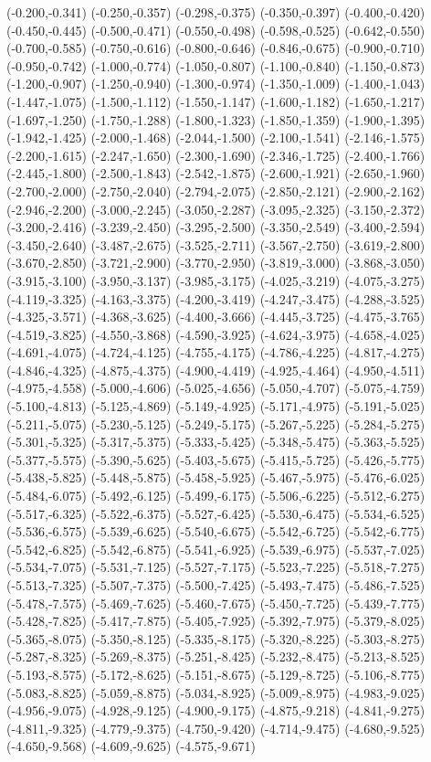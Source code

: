 (-0.200,-0.341) (-0.250,-0.357) (-0.298,-0.375) (-0.350,-0.397) (-0.400,-0.420) (-0.450,-0.445) (-0.500,-0.471) (-0.550,-0.498) (-0.598,-0.525) (-0.642,-0.550) (-0.700,-0.585) (-0.750,-0.616) (-0.800,-0.646) (-0.846,-0.675) (-0.900,-0.710) (-0.950,-0.742) (-1.000,-0.774) (-1.050,-0.807) (-1.100,-0.840) (-1.150,-0.873) (-1.200,-0.907) (-1.250,-0.940) (-1.300,-0.974) (-1.350,-1.009) (-1.400,-1.043) (-1.447,-1.075) (-1.500,-1.112) (-1.550,-1.147) (-1.600,-1.182) (-1.650,-1.217) (-1.697,-1.250) (-1.750,-1.288) (-1.800,-1.323) (-1.850,-1.359) (-1.900,-1.395) (-1.942,-1.425) (-2.000,-1.468) (-2.044,-1.500) (-2.100,-1.541) (-2.146,-1.575) (-2.200,-1.615) (-2.247,-1.650) (-2.300,-1.690) (-2.346,-1.725) (-2.400,-1.766) (-2.445,-1.800) (-2.500,-1.843) (-2.542,-1.875) (-2.600,-1.921) (-2.650,-1.960) (-2.700,-2.000) (-2.750,-2.040) (-2.794,-2.075) (-2.850,-2.121) (-2.900,-2.162) (-2.946,-2.200) (-3.000,-2.245) (-3.050,-2.287) (-3.095,-2.325) (-3.150,-2.372) (-3.200,-2.416) (-3.239,-2.450) (-3.295,-2.500) (-3.350,-2.549) (-3.400,-2.594) (-3.450,-2.640) (-3.487,-2.675) (-3.525,-2.711) (-3.567,-2.750) (-3.619,-2.800) (-3.670,-2.850) (-3.721,-2.900) (-3.770,-2.950) (-3.819,-3.000) (-3.868,-3.050) (-3.915,-3.100) (-3.950,-3.137) (-3.985,-3.175) (-4.025,-3.219) (-4.075,-3.275) (-4.119,-3.325) (-4.163,-3.375) (-4.200,-3.419) (-4.247,-3.475) (-4.288,-3.525) (-4.325,-3.571) (-4.368,-3.625) (-4.400,-3.666) (-4.445,-3.725) (-4.475,-3.765) (-4.519,-3.825) (-4.550,-3.868) (-4.590,-3.925) (-4.624,-3.975) (-4.658,-4.025) (-4.691,-4.075) (-4.724,-4.125) (-4.755,-4.175) (-4.786,-4.225) (-4.817,-4.275) (-4.846,-4.325) (-4.875,-4.375) (-4.900,-4.419) (-4.925,-4.464) (-4.950,-4.511) (-4.975,-4.558) (-5.000,-4.606) (-5.025,-4.656) (-5.050,-4.707) (-5.075,-4.759) (-5.100,-4.813) (-5.125,-4.869) (-5.149,-4.925) (-5.171,-4.975) (-5.191,-5.025) (-5.211,-5.075) (-5.230,-5.125) (-5.249,-5.175) (-5.267,-5.225) (-5.284,-5.275) (-5.301,-5.325) (-5.317,-5.375) (-5.333,-5.425) (-5.348,-5.475) (-5.363,-5.525) (-5.377,-5.575) (-5.390,-5.625) (-5.403,-5.675) (-5.415,-5.725) (-5.426,-5.775) (-5.438,-5.825) (-5.448,-5.875) (-5.458,-5.925) (-5.467,-5.975) (-5.476,-6.025) (-5.484,-6.075) (-5.492,-6.125) (-5.499,-6.175) (-5.506,-6.225) (-5.512,-6.275) (-5.517,-6.325) (-5.522,-6.375) (-5.527,-6.425) (-5.530,-6.475) (-5.534,-6.525) (-5.536,-6.575) (-5.539,-6.625) (-5.540,-6.675) (-5.542,-6.725) (-5.542,-6.775) (-5.542,-6.825) (-5.542,-6.875) (-5.541,-6.925) (-5.539,-6.975) (-5.537,-7.025) (-5.534,-7.075) (-5.531,-7.125) (-5.527,-7.175) (-5.523,-7.225) (-5.518,-7.275) (-5.513,-7.325) (-5.507,-7.375) (-5.500,-7.425) (-5.493,-7.475) (-5.486,-7.525) (-5.478,-7.575) (-5.469,-7.625) (-5.460,-7.675) (-5.450,-7.725) (-5.439,-7.775) (-5.428,-7.825) (-5.417,-7.875) (-5.405,-7.925) (-5.392,-7.975) (-5.379,-8.025) (-5.365,-8.075) (-5.350,-8.125) (-5.335,-8.175) (-5.320,-8.225) (-5.303,-8.275) (-5.287,-8.325) (-5.269,-8.375) (-5.251,-8.425) (-5.232,-8.475) (-5.213,-8.525) (-5.193,-8.575) (-5.172,-8.625) (-5.151,-8.675) (-5.129,-8.725) (-5.106,-8.775) (-5.083,-8.825) (-5.059,-8.875) (-5.034,-8.925) (-5.009,-8.975) (-4.983,-9.025) (-4.956,-9.075) (-4.928,-9.125) (-4.900,-9.175) (-4.875,-9.218) (-4.841,-9.275) (-4.811,-9.325) (-4.779,-9.375) (-4.750,-9.420) (-4.714,-9.475) (-4.680,-9.525) (-4.650,-9.568) (-4.609,-9.625) (-4.575,-9.671) 